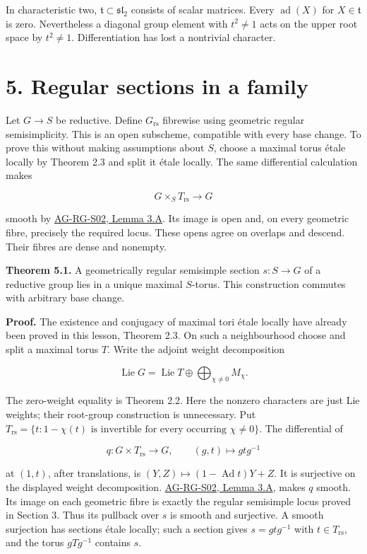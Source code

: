 \documentclass[11pt,a4paper,openany]{report}
\newcounter{none}
\begin{document}
In characteristic two, \(\mathfrak t\subset\mathfrak{sl}_2\) consists of scalar matrices. Every \(\operatorname{ad}(X)\) for \(X\in\mathfrak t\) is zero. Nevertheless a diagonal group element with \(t^2\ne1\) acts on the upper root space by \(t^2\ne1\). Differentiation has lost a nontrivial character.

\section{5. Regular sections in a family}\label{AG-RG-02-regular-sections-in-a-family}

Let \(G\to S\) be reductive. Define \(G_{\mathrm{rs}}\) fibrewise using geometric regular semisimplicity. This is an open subscheme, compatible with every base change. To prove this without making assumptions about \(S\), choose a maximal torus étale locally by Theorem 2.3 and split it étale locally. The same differential calculation makes

\[
G\times_S T_{\mathrm{rs}}\longrightarrow G
\]

smooth by \href{AG-RG-S02.html\#smooth-map-differential}{AG-RG-S02, Lemma 3.A}. Its image is open and, on every geometric fibre, precisely the required locus. These opens agree on overlaps and descend. Their fibres are dense and nonempty.

\textbf{Theorem 5.1.} A geometrically regular semisimple section \(s:S\to G\) of a reductive group lies in a unique maximal \(S\)-torus. This construction commutes with arbitrary base change.

\textbf{Proof.} The existence and conjugacy of maximal tori étale locally have already been proved in this lesson, Theorem 2.3. On such a neighbourhood choose and split a maximal torus \(T\). Write the adjoint weight decomposition

\[
\operatorname{Lie}G=\operatorname{Lie}T\oplus\bigoplus_{\chi\ne0} M_\chi.
\]

The zero-weight equality is Theorem 2.2. Here the nonzero characters are just Lie weights; their root-group construction is unnecessary. Put \(T_{\mathrm{rs}}=\{t:1-\chi(t)\text{ is invertible for every occurring }\chi\ne0\}\). The differential of

\[
q:G\times T_{\mathrm{rs}}\longrightarrow G,\qquad (g,t)\longmapsto gtg^{-1}
\]

at \((1,t)\), after translations, is \((Y,Z)\mapsto(1-\operatorname{Ad}t)Y+Z\). It is surjective on the displayed weight decomposition. \href{AG-RG-S02.html\#smooth-map-differential}{AG-RG-S02, Lemma 3.A}, makes \(q\) smooth. Its image on each geometric fibre is exactly the regular semisimple locus proved in Section 3. Thus its pullback over \(s\) is smooth and surjective. A smooth surjection has sections étale locally; such a section gives \(s=gtg^{-1}\) with \(t\in T_{\mathrm{rs}}\), and the torus \(gTg^{-1}\) contains \(s\).
\end{document}
